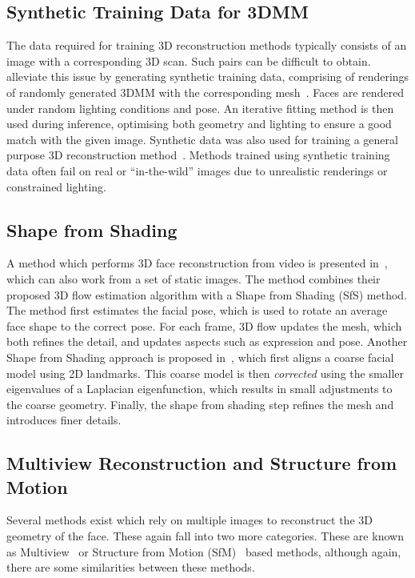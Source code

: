 \subsection{Synthetic Training Data for 3DMM}
The data required for training 3D reconstruction methods typically
consists of an image with a corresponding 3D scan. Such pairs can be
difficult to obtain. \citeauthor{richardson20163d} alleviate this
issue by generating synthetic training data, comprising of renderings
of randomly generated 3DMM with the corresponding
mesh~\cite{richardson20163d}. Faces are rendered under random lighting
conditions and pose. An iterative fitting method is then used during
inference, optimising both geometry and lighting to ensure a good
match with the given image. Synthetic data was also used for training
a general purpose 3D reconstruction method~\cite{li2015joint}. Methods
trained using synthetic training data often fail on real or
``in-the-wild'' images due to unrealistic renderings or constrained
lighting.



\subsection{Shape from Shading}
A method which performs 3D face reconstruction from video is presented
in~\cite{suwajanakorn2014total}, which can also work from a set of
static images. The method combines their proposed 3D flow estimation
algorithm with a Shape from Shading (SfS) method. The method first
estimates the facial pose, which is used to rotate an average face
shape to the correct pose. For each frame, 3D flow updates the mesh,
which both refines the detail, and updates aspects such as expression
and pose. Another Shape from Shading approach is proposed
in~\cite{jiang20183d}, which first aligns a coarse facial model using
2D landmarks. This coarse model is then \textit{corrected} using the
smaller eigenvalues of a Laplacian eigenfunction, which results in
small adjustments to the coarse geometry. Finally, the shape from
shading step refines the mesh and introduces finer details.

\subsection{Multiview Reconstruction and Structure from Motion}

Several methods exist which rely on multiple images to reconstruct the
3D geometry of the face. These again fall into two more
categories. These are known as
Multiview~\cite{mayo20093d,dou2018multi} or Structure from Motion
(SfM)~\cite{dou2018multi,dai2018coarse,Piotraschke_2016_CVPR} based
methods, although again, there are some similarities between these
methods.

